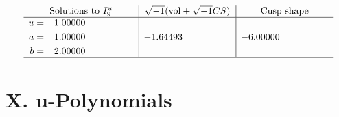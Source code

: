 \documentclass[1p]{elsarticle_modified}
\theoremstyle{definition}
\newcommand{\I}{\sqrt{-1}}
\begin{document}
$$\begin{array}{c|c|c}  
\text{Solutions to }I^u_{9}& \I (\text{vol} + \sqrt{-1}CS) & \text{Cusp shape}\\
 \hline 
\begin{aligned}
u &= \phantom{-}1.00000\phantom{ +0.000000I} \\
a &= \phantom{-}1.00000\phantom{ +0.000000I} \\
b &= \phantom{-}2.00000\phantom{ +0.000000I}\end{aligned}
 & -1.64493\phantom{ +0.000000I} & -6.00000\phantom{ +0.000000I}\\
 \hline 
 \end{array}$$\newpage
\newpage\renewcommand{\arraystretch}{1}
\centering \section*{ X. u-Polynomials}
\end{document}
